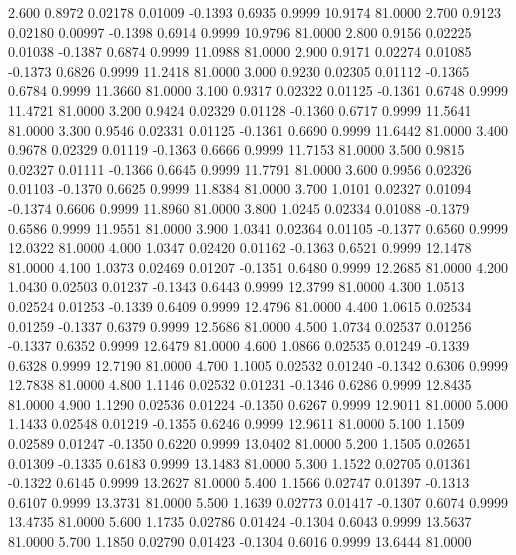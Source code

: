    2.600   0.8972   0.02178   0.01009  -0.1393   0.6935   0.9999  10.9174  81.0000
   2.700   0.9123   0.02180   0.00997  -0.1398   0.6914   0.9999  10.9796  81.0000
   2.800   0.9156   0.02225   0.01038  -0.1387   0.6874   0.9999  11.0988  81.0000
   2.900   0.9171   0.02274   0.01085  -0.1373   0.6826   0.9999  11.2418  81.0000
   3.000   0.9230   0.02305   0.01112  -0.1365   0.6784   0.9999  11.3660  81.0000
   3.100   0.9317   0.02322   0.01125  -0.1361   0.6748   0.9999  11.4721  81.0000
   3.200   0.9424   0.02329   0.01128  -0.1360   0.6717   0.9999  11.5641  81.0000
   3.300   0.9546   0.02331   0.01125  -0.1361   0.6690   0.9999  11.6442  81.0000
   3.400   0.9678   0.02329   0.01119  -0.1363   0.6666   0.9999  11.7153  81.0000
   3.500   0.9815   0.02327   0.01111  -0.1366   0.6645   0.9999  11.7791  81.0000
   3.600   0.9956   0.02326   0.01103  -0.1370   0.6625   0.9999  11.8384  81.0000
   3.700   1.0101   0.02327   0.01094  -0.1374   0.6606   0.9999  11.8960  81.0000
   3.800   1.0245   0.02334   0.01088  -0.1379   0.6586   0.9999  11.9551  81.0000
   3.900   1.0341   0.02364   0.01105  -0.1377   0.6560   0.9999  12.0322  81.0000
   4.000   1.0347   0.02420   0.01162  -0.1363   0.6521   0.9999  12.1478  81.0000
   4.100   1.0373   0.02469   0.01207  -0.1351   0.6480   0.9999  12.2685  81.0000
   4.200   1.0430   0.02503   0.01237  -0.1343   0.6443   0.9999  12.3799  81.0000
   4.300   1.0513   0.02524   0.01253  -0.1339   0.6409   0.9999  12.4796  81.0000
   4.400   1.0615   0.02534   0.01259  -0.1337   0.6379   0.9999  12.5686  81.0000
   4.500   1.0734   0.02537   0.01256  -0.1337   0.6352   0.9999  12.6479  81.0000
   4.600   1.0866   0.02535   0.01249  -0.1339   0.6328   0.9999  12.7190  81.0000
   4.700   1.1005   0.02532   0.01240  -0.1342   0.6306   0.9999  12.7838  81.0000
   4.800   1.1146   0.02532   0.01231  -0.1346   0.6286   0.9999  12.8435  81.0000
   4.900   1.1290   0.02536   0.01224  -0.1350   0.6267   0.9999  12.9011  81.0000
   5.000   1.1433   0.02548   0.01219  -0.1355   0.6246   0.9999  12.9611  81.0000
   5.100   1.1509   0.02589   0.01247  -0.1350   0.6220   0.9999  13.0402  81.0000
   5.200   1.1505   0.02651   0.01309  -0.1335   0.6183   0.9999  13.1483  81.0000
   5.300   1.1522   0.02705   0.01361  -0.1322   0.6145   0.9999  13.2627  81.0000
   5.400   1.1566   0.02747   0.01397  -0.1313   0.6107   0.9999  13.3731  81.0000
   5.500   1.1639   0.02773   0.01417  -0.1307   0.6074   0.9999  13.4735  81.0000
   5.600   1.1735   0.02786   0.01424  -0.1304   0.6043   0.9999  13.5637  81.0000
   5.700   1.1850   0.02790   0.01423  -0.1304   0.6016   0.9999  13.6444  81.0000
